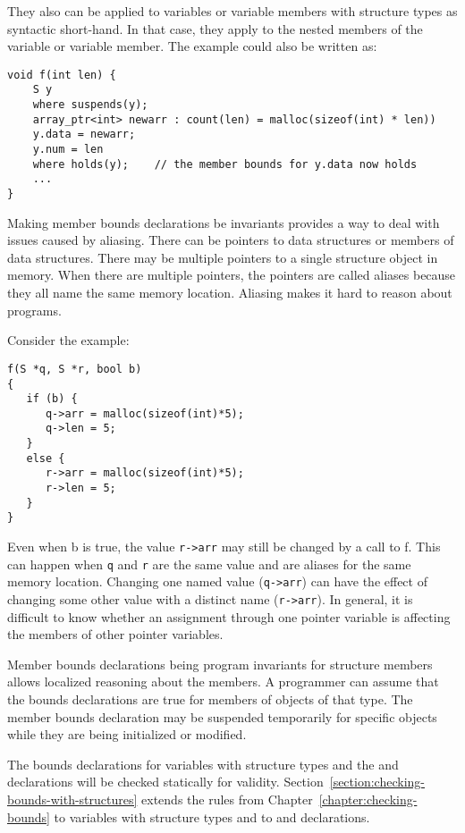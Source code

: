 They also can be applied to variables or variable members with structure
types as syntactic short-hand. In that case, they apply to the nested
members of the variable or variable member. The example could also be
written as:

\begin{lstlisting}
void f(int len) {
    S y 
    where suspends(y);
    array_ptr<int> newarr : count(len) = malloc(sizeof(int) * len))
    y.data = newarr;
    y.num = len
    where holds(y);    // the member bounds for y.data now holds
    ...
}
\end{lstlisting}

Making member bounds declarations be invariants provides a way to deal with issues
caused by aliasing. There can be pointers to data structures or members
of data structures. There may be multiple pointers to a single
structure object in memory. When there are multiple pointers,
the pointers are called aliases because they all name the same
memory location.  Aliasing makes it hard to reason about programs.

Consider the example:
\begin{lstlisting}
f(S *q, S *r, bool b)
{
   if (b) {
      q->arr = malloc(sizeof(int)*5);
      q->len = 5;
   }
   else {
      r->arr = malloc(sizeof(int)*5);
      r->len = 5;
   }
}
\end{lstlisting}

Even when b is true, the value \texttt{r->arr} may still be
changed by a call to f. This can happen when \texttt{q} and \texttt{r}
are the same value and are aliases for the same memory location.
Changing one named value (\texttt{q->arr}) can have the
effect of changing some other value with a distinct name
(\texttt{r->arr}). In general, it is difficult to know
whether an assignment through one pointer variable is affecting the
members of other pointer variables.

Member bounds declarations being program invariants for structure members allows
localized reasoning about the members. A programmer can assume that the
bounds declarations are true for members of objects of that type. The member bounds
declaration may be suspended temporarily for specific objects while they are being
initialized or modified.

The bounds declarations for variables with structure types and the
 and  declarations will be checked statically
for validity.  Section~\ref{section:checking-bounds-with-structures} extends
the rules from Chapter~\ref{chapter:checking-bounds} to variables with structure
types and to  and  declarations.

